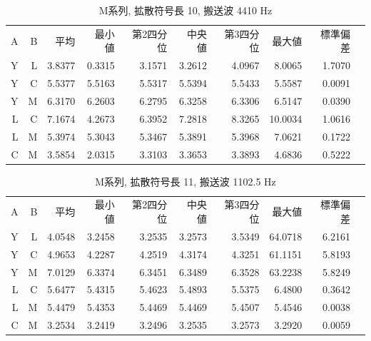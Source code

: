 \begin{table}[p]\centering
  \caption{M系列, 拡散符号長 10, 搬送波 4410 Hz}
  \label{tab:hikaku17}
  \begin{tabular}{rrrrrrrrrr}
    \hline
     A & B & 平均 & 最小値 & 第2四分位 & 中央値 & 第3四分位 & 最大値 & 標準偏差 \\
     Y & L & 3.8377 & 0.3315 & 3.1571 & 3.2612 & 4.0967 & 8.0065 & 1.7070 \\
     Y & C & 5.5377 & 5.5163 & 5.5317 & 5.5394 & 5.5433 & 5.5587 & 0.0091 \\
     Y & M & 6.3170 & 6.2603 & 6.2795 & 6.3258 & 6.3306 & 6.5147 & 0.0390 \\
     L & C & 7.1674 & 4.2673 & 6.3952 & 7.2818 & 8.3265 & 10.0034 & 1.0616 \\
     L & M & 5.3974 & 5.3043 & 5.3467 & 5.3891 & 5.3968 & 7.0621 & 0.1722 \\
     C & M & 3.5854 & 2.0315 & 3.3103 & 3.3653 & 3.3893 & 4.6836 & 0.5222 \\
    \hline
  \end{tabular}
\end{table}

\begin{table}[p]\centering
  \caption{M系列, 拡散符号長 11, 搬送波 1102.5 Hz}
  \label{tab:hikaku18}
  \begin{tabular}{rrrrrrrrrr}
    \hline
     A & B & 平均 & 最小値 & 第2四分位 & 中央値 & 第3四分位 & 最大値 & 標準偏差 \\
     Y & L & 4.0548 & 3.2458 & 3.2535 & 3.2573 & 3.5349 & 64.0718 & 6.2161 \\
     Y & C & 4.9653 & 4.2287 & 4.2519 & 4.3174 & 4.3251 & 61.1151 & 5.8193 \\
     Y & M & 7.0129 & 6.3374 & 6.3451 & 6.3489 & 6.3528 & 63.2238 & 5.8249 \\
     L & C & 5.6477 & 5.4315 & 5.4623 & 5.4893 & 5.5375 & 6.4800 & 0.3642 \\
     L & M & 5.4479 & 5.4353 & 5.4469 & 5.4469 & 5.4507 & 5.4546 & 0.0038 \\
     C & M & 3.2534 & 3.2419 & 3.2496 & 3.2535 & 3.2573 & 3.2920 & 0.0059 \\
    \hline
  \end{tabular}
\end{table}

